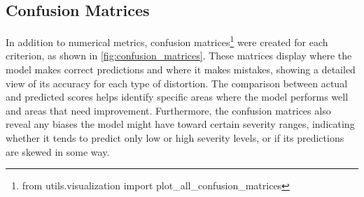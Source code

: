 \subsection{Confusion Matrices}
\label{subsec:ConfusionMatrices}
In addition to numerical metrics, confusion matrices\footnote{from utils.visualization import plot\_all\_confusion\_matrices} were created for each criterion, as shown in \autoref{fig:confusion_matrices}. These matrices display where the model makes correct predictions and where it makes mistakes, showing a detailed view of its accuracy for each type of distortion. The comparison between actual and predicted scores helps identify specific areas where the model performs well and areas that need improvement. Furthermore, the confusion matrices also reveal any biases the model might have toward certain severity ranges, indicating whether it tends to predict only low or high severity levels, or if its predictions are skewed in some way. \par
\vspace{\baselineskip}
